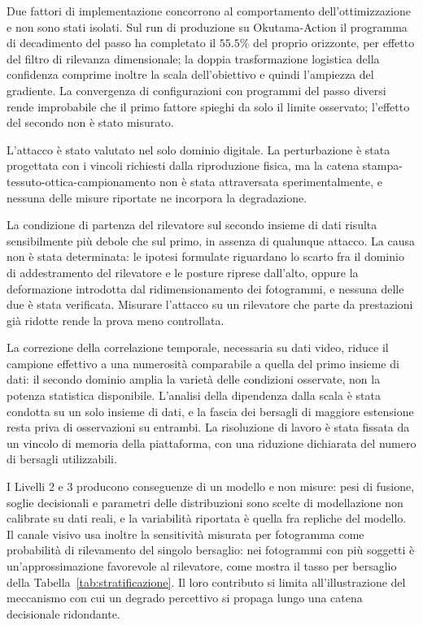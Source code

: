 \ifstampa\documentclass[a4paper,12pt,twoside,openright]{report}\else\documentclass[a4paper,12pt]{report}\fi
\newif\ifrevisione \revisionefalse
\DeclareRobustCommand{\rev}[1]{\ifrevisione{\color{blue!65!black}#1}\else#1\fi}
\begin{document}
\rev{Due fattori di implementazione concorrono al comportamento dell'ottimizzazione e non sono stati isolati. Sul run di produzione su Okutama-Action il programma di decadimento del passo ha completato il $55.5\%$ del proprio orizzonte, per effetto del filtro di rilevanza dimensionale; la doppia trasformazione logistica della confidenza comprime inoltre la scala dell'obiettivo e quindi l'ampiezza del gradiente. La convergenza di configurazioni con programmi del passo diversi rende improbabile che il primo fattore spieghi da solo il limite osservato; l'effetto del secondo non è stato misurato.}

L'attacco è stato valutato nel solo dominio digitale. La perturbazione è stata progettata con i vincoli richiesti dalla riproduzione fisica, ma la catena stampa-tessuto-ottica-campionamento non è stata attraversata sperimentalmente, e nessuna delle misure riportate ne incorpora la degradazione.

La condizione di partenza del rilevatore sul secondo insieme di dati risulta sensibilmente più debole che sul primo, in assenza di qualunque attacco. La causa non è stata determinata: le ipotesi formulate riguardano lo scarto fra il dominio di addestramento del rilevatore e le posture riprese dall'alto, oppure la deformazione introdotta dal ridimensionamento dei fotogrammi, e nessuna delle due è stata verificata. \rev{Misurare l'attacco su un rilevatore che parte da prestazioni già ridotte rende la prova meno controllata.}

La correzione della correlazione temporale, necessaria su dati video, riduce il campione effettivo a una numerosità comparabile a quella del primo insieme di dati: il secondo dominio amplia la varietà delle condizioni osservate, non la potenza statistica disponibile. L'analisi della dipendenza dalla scala è stata condotta su un solo insieme di dati, e la fascia dei bersagli di maggiore estensione resta priva di osservazioni su entrambi. La risoluzione di lavoro è stata fissata da un vincolo di memoria della piattaforma, con una riduzione dichiarata del numero di bersagli utilizzabili.

\rev{I Livelli 2 e 3 producono conseguenze di un modello e non misure: pesi di fusione, soglie decisionali e parametri delle distribuzioni sono scelte di modellazione non calibrate su dati reali, e la variabilità riportata è quella fra repliche del modello. Il canale visivo usa inoltre la sensitività misurata per fotogramma come probabilità di rilevamento del singolo bersaglio: nei fotogrammi con più soggetti è un'approssimazione favorevole al rilevatore, come mostra il tasso per bersaglio della Tabella~\ref{tab:stratificazione}.} Il loro contributo si limita all'illustrazione del meccanismo con cui un degrado percettivo si propaga lungo una catena decisionale ridondante.
\end{document}

